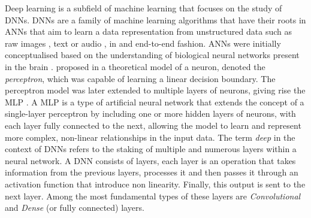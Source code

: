 Deep learning is a subfield of machine learning that focuses on the study of
\acp{DNN}. \acp{DNN} are a family of machine learning algorithms that have their
roots in \acp{ANN} that aim to learn a data representation from unstructured
data such as raw images \cite{DBLP:conf/nips/KrizhevskySH12}, text
\cite{DBLP:conf/emnlp/BudzianowskiV19} or audio
\cite{DBLP:journals/corr/HannunCCCDEPSSCN14}, in and end-to-end fashion.
\acp{ANN} were initially conceptualised based on the understanding of biological
neural networks present in the brain
\cite{mcculloch1943logical,hebb2005organization}.
\citeauthor{rosenblatt1958perceptron} proposed in
\cite{rosenblatt1958perceptron} a theoretical model of a neuron, denoted the
\emph{perceptron}, which was capable of learning a linear decision boundary. The
perceptron model was later extended to multiple layers of neurons, giving rise
the \ac{MLP} \cite{rosenblatt1961principles,rumelhart1986learning}. A \acl{MLP}
is a type of artificial neural network that extends the concept of a
single-layer perceptron by including one or more hidden layers of neurons, with
each layer fully connected to the next, allowing the model to learn and
represent more complex, non-linear relationships in the input data. The term
\emph{deep} in the context of \acp{DNN} refers to the staking of multiple and
numerous layers within a neural network. A \ac{DNN} consists of layers, each
layer is an operation that takes information from the previous layers, processes
it and then passes it through an activation function
\cite{glorot2011deep,DBLP:journals/pieee/LeCunBBH98,klambauer2017self} that
introduce non linearity. Finally, this output is sent to the next layer. Among
the most fundamental types of these layers are \emph{Convolutional} and
\emph{Dense} (or fully connected) layers. \\

